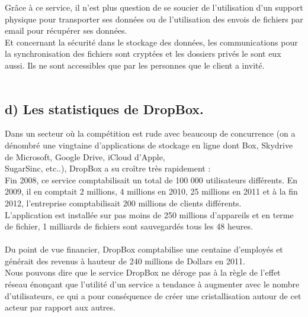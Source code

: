\documentclass[a4paper, 10pt]{article}
\begin{document}
\newpage
\noindent
Gr\^ace \`a ce service, il n'est plus question de se soucier de l'utilisation d'un support physique pour transporter ses donn\'ees
ou de l'utilisation des envois de fichiers par email pour r\'ecup\'erer ses donn\'ees.\\
Et concernant la s\'ecurit\'e dans le stockage des donn\'ees, les communications pour la synchronisation des fichiers sont crypt\'ees et
les dossiers priv\'es le sont eux aussi. Ils ne sont accessibles que par les personnes que le client a invit\'e.\\ \\

\subsection*{d) Les statistiques de DropBox.}
Dans un secteur o\`u la comp\'etition est rude avec beaucoup de concurrence
(on a d\'enombr\'e une vingtaine d'applications de stockage en ligne dont Box, Skydrive de Microsoft, Google Drive, iCloud d'Apple,\\SugarSinc,
etc..), DropBox a su cro\^itre tr\`es rapidement :\\
Fin 2008, ce service comptabilisait un total de 100 000 utilisateurs diff\'erents.
En 2009, il en comptait 2 millions, 4 millions en 2010, 25 millions en 2011 et
\`a la fin 2012, l'entreprise comptabilisait 200 millions de clients diff\'erents.\\
L'application est install\'ee sur pas moins de 250 millions d'appareils et
en terme de fichier, 1 milliards de fichiers sont sauvegard\'es tous les 48 heures.\\ \\
Du point de vue financier, DropBox comptabilise une centaine d'employ\'es et g\'en\'erait des revenus \`a hauteur
de 240 millions de Dollars en 2011.\\
Nous pouvons dire que le service DropBox ne d\'eroge pas \`a la r\`egle de l'effet r\'eseau \'enonçant que l'utilit\'e d'un service
a tendance \`a augmenter avec le nombre d'utilisateurs, ce qui a pour cons\'equence de cr\'eer une cristallisation autour de cet acteur
par rapport aux autres.\\ \\
\end{document}
